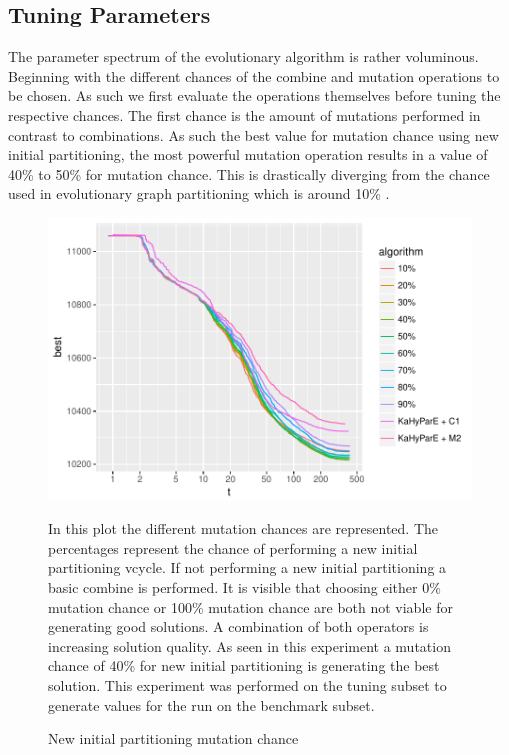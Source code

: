 \documentclass[a4paper,12pt,titlepage, BCOR7mm,headsepline]{scrbook}
\numberwithin{equation}{section}
\begin{document}
\subsection{Tuning Parameters}
The parameter spectrum of the evolutionary algorithm is rather voluminous. Beginning with the different chances of the combine and mutation operations to be chosen. As such we first evaluate the operations themselves before tuning the respective chances. The first chance is the amount of mutations performed in contrast to combinations. As such the best value for mutation chance using new initial partitioning, the most powerful mutation operation results in a value of 40\% to 50\% for mutation chance. This is drastically diverging from the chance used in evolutionary graph partitioning which is around 10\% \cite{sanders2012distributed}. 
\begin{figure}[H]
\caption{New initial partitioning mutation chance}
\begin{center}
\includegraphics{bachelorarbeit-newipmutationchance}
\end{center}
In this plot the different mutation chances are represented. The percentages represent the chance of performing a new initial partitioning vcycle. If not performing a new initial partitioning a basic combine is performed. It is visible that choosing either 0\% mutation chance or 100\% mutation chance are both not viable for generating good solutions. A combination of both operators is increasing solution quality. As seen in this experiment a mutation chance of 40\% for new initial partitioning is generating the best solution. This experiment was performed on the tuning subset to generate values for the run on the benchmark subset.
\end{figure}
\end{document}
